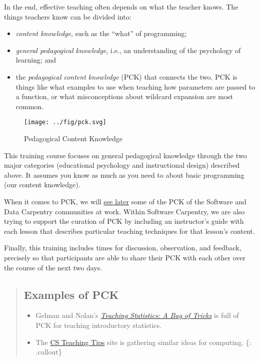 In the end, effective teaching often depends on what the teacher knows.
The things teachers know can be divided into:

\begin{itemize}
\item
  \emph{content knowledge}, such as the ``what'' of programming;
\item
  \emph{general pedagogical knowledge}, i.e., an understanding of the
  psychology of learning; and
\item
  the \emph{pedagogical content knowledge} (PCK) that connects the two.
  PCK is things like what examples to use when teaching how parameters
  are passed to a function, or what misconceptions about wildcard
  expansion are most common.
\end{itemize}

\begin{figure}[htbp]
\centering
\texttt{[image: ../fig/pck.svg]}
\caption{Pedagogical Content Knowledge}
\end{figure}

This training course focuses on general pedagogical knowledge through
the two major categories (educational psychology and instructional
design) described above. It assumes you know as much as you need to
about basic programming (our content knowledge).

When it comes to PCK, we will
\href{\{\{\%20page.root\%20\}\}/16-practices/}{see later} some of the
PCK of the Software and Data Carpentry communities at work. Within
Software Carpentry, we are also trying to support the curation of PCK by
including an instructor's guide with each lesson that describes
particular teaching techniques for that lesson's content.

Finally, this training includes times for discussion, observation, and
feedback, precisely so that participants are able to share their PCK
with each other over the course of the next two days.

\begin{quote}
\subsection{Examples of PCK}\label{examples-of-pck}

\begin{itemize}
\itemsep1pt\parskip0pt
\item
  Gelman and Nolan's
  \emph{\href{http://www.amazon.com/Teaching-Statistics-Tricks-Andrew-Gelman/dp/0198572247/}{Teaching
  Statistics: A Bag of Tricks}} is full of PCK for teaching introductory
  statistics.
\item
  The \href{http://csteachingtips.org/}{CS Teaching Tips} site is
  gathering similar ideas for computing. \{: .callout\}
\end{itemize}
\end{quote}

